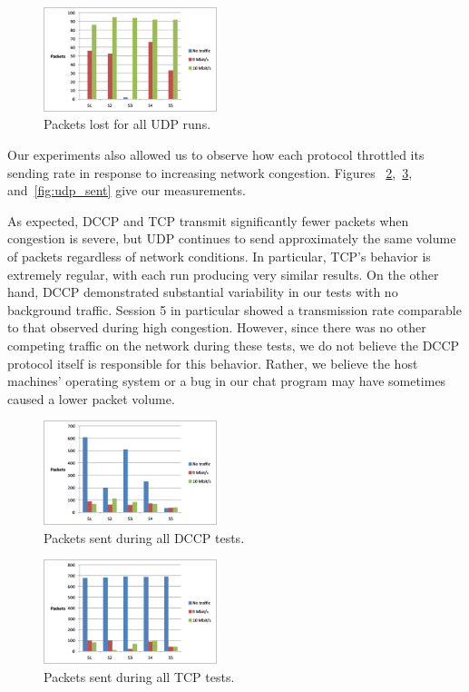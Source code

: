 \begin{figure}[!h]
   \centering
      \includegraphics[width=0.45\textwidth]{pics/udp_losses}
   \caption{Packets lost for all UDP runs.}
\label{fig:udp_losses}
\end{figure}

Our experiments also allowed us to observe how each protocol throttled its
sending rate in response to increasing network congestion. Figures
~\ref{fig:dccp_sent},~\ref{fig:tcp_sent}, and~\ref{fig:udp_sent} give our
measurements.

As expected, DCCP and TCP transmit significantly fewer packets when congestion
is severe, but UDP continues to send approximately the same volume of packets
regardless of network conditions. In particular, TCP's behavior is extremely
regular, with each run producing very similar results. On the other hand, DCCP
demonstrated substantial variability in our tests with no background traffic.
Session 5 in particular showed a transmission rate comparable to that observed
during high congestion. However, since there was no other competing traffic on
the network during these tests, we do not believe the DCCP protocol itself is
responsible for this behavior. Rather, we believe the host machines' operating
system or a bug in our chat program may have sometimes caused a lower packet
volume.

\begin{figure}[!h]
   \centering
      \includegraphics[width=0.45\textwidth]{pics/dccp_sent}
   \caption{Packets sent during all DCCP tests.}
\label{fig:dccp_sent}
\end{figure}

\begin{figure}[!h]
   \centering
      \includegraphics[width=0.45\textwidth]{pics/tcp_sent}
   \caption{Packets sent during all TCP tests.}
\label{fig:tcp_sent}
\end{figure}

